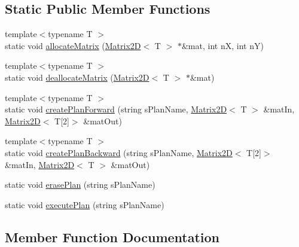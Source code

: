 \subsection*{Static Public Member Functions}
\begin{DoxyCompactItemize}
\item 
{\footnotesize template$<$typename T $>$ }\\static void \hyperlink{class_interface_f_f_t_w_ad0a54971c30188421efa89e7bb1de5be}{allocate\+Matrix} (\hyperlink{class_matrix2_d}{Matrix2\+D}$<$ T $>$ $\ast$\&mat, int n\+X, int n\+Y)
\item 
{\footnotesize template$<$typename T $>$ }\\static void \hyperlink{class_interface_f_f_t_w_a596e338aa62af9353d2fc61b5b39d989}{deallocate\+Matrix} (\hyperlink{class_matrix2_d}{Matrix2\+D}$<$ T $>$ $\ast$\&mat)
\item 
{\footnotesize template$<$typename T $>$ }\\static void \hyperlink{class_interface_f_f_t_w_ae4f34532c57a98db7339f8726054c497}{create\+Plan\+Forward} (string s\+Plan\+Name, \hyperlink{class_matrix2_d}{Matrix2\+D}$<$ T $>$ \&mat\+In, \hyperlink{class_matrix2_d}{Matrix2\+D}$<$ T\mbox{[}2\mbox{]}$>$ \&mat\+Out)
\item 
{\footnotesize template$<$typename T $>$ }\\static void \hyperlink{class_interface_f_f_t_w_a4986e58342aa4f57a1dc4d3f580d3241}{create\+Plan\+Backward} (string s\+Plan\+Name, \hyperlink{class_matrix2_d}{Matrix2\+D}$<$ T\mbox{[}2\mbox{]}$>$ \&mat\+In, \hyperlink{class_matrix2_d}{Matrix2\+D}$<$ T $>$ \&mat\+Out)
\item 
static void \hyperlink{class_interface_f_f_t_w_a924f23a03902c771f1ebd06ce9fe65a7}{erase\+Plan} (string s\+Plan\+Name)
\item 
static void \hyperlink{class_interface_f_f_t_w_ab8a43c25e4cef9fef7c5e842084a367d}{execute\+Plan} (string s\+Plan\+Name)
\end{DoxyCompactItemize}


\subsection{Member Function Documentation}
\hypertarget{class_interface_f_f_t_w_a89d340aba6fcaef5f9a50b106970192d}{}
